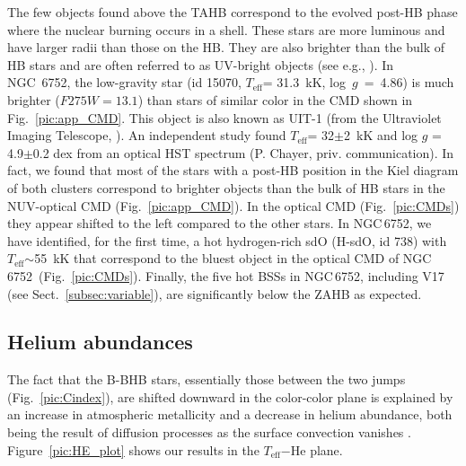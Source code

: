 \documentclass{aa}
\newcommand{\teff}{$T_{\text{eff}}$}
\newcommand{\ngc}{NGC\,6752}
\begin{document}
The few objects found above the TAHB correspond to the evolved post-HB phase where the nuclear burning occurs in a shell. These stars are more luminous and have larger radii than those on the HB. They are also brighter than the bulk of HB stars and are often referred to as UV-bright objects (see e.g., \citealt{moehler2019}). 
In NGC~6752, the low-gravity star (id 15070, \teff = 31.3~kK, log~$g$~=~4.86) is much brighter ($F275W=13.1$) than stars of similar color in the CMD shown in Fig.~\ref{pic:app_CMD}. This object is also known as UIT-1 (from the Ultraviolet Imaging Telescope, \citealt{landsman1996}). An independent study found \teff = 32$\pm$2~kK and log $g$ = 4.9$\pm$0.2 dex from an optical HST spectrum (P. Chayer, priv. communication). 
In fact, we found that most of the stars with a post-HB position in the Kiel diagram of both clusters correspond to brighter objects than the bulk of HB stars in the NUV-optical CMD (Fig.~\ref{pic:app_CMD}). In the optical CMD (Fig.~\ref{pic:CMDs}) they appear shifted to the left compared to the other stars.
In \ngc, we have identified, for the first time, a hot hydrogen-rich sdO (H-sdO, id 738) with \teff$\sim$55~kK that
correspond to the bluest object in the optical CMD of \ngc\ (Fig.~\ref{pic:CMDs}). 
Finally, the five hot BSSs in \ngc, including V17 (see Sect.~\ref{subsec:variable}), are significantly below the ZAHB as expected.  


\subsection{Helium abundances}\label{subsubsec:helium}

The fact that the B-BHB stars, essentially those between the two jumps (Fig.~\ref{pic:Cindex}), are shifted downward in the color-color plane is explained by an increase in atmospheric metallicity and a decrease in helium abundance, both being the result of diffusion processes as the surface convection vanishes \citep{brown16}.
Figure~\ref{pic:HE_plot} shows our results in the \teff$-$He plane.
\end{document}
